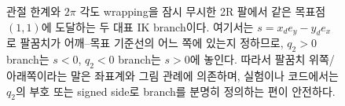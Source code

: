 \begin{figure}[!htbp]
{%
  }
  \caption{관절 한계와 \(2\pi\) 각도 wrapping을 잠시 무시한 2R 팔에서 같은 목표점 \((1,1)\)에 도달하는 두 대표 IK branch이다. 여기서는 \(s=x_d e_y-y_d e_x\)로 팔꿈치가 어깨--목표 기준선의 어느 쪽에 있는지 정하므로, \(q_2>0\) branch는 \(s<0\), \(q_2<0\) branch는 \(s>0\)에 놓인다. 따라서 팔꿈치 위쪽/아래쪽이라는 말은 좌표계와 그림 관례에 의존하며, 실험이나 코드에서는 \(q_2\)의 부호 또는 signed side로 branch를 분명히 정의하는 편이 안전하다.}
  \label{fig:two-link-ik-branches}
\end{figure}
